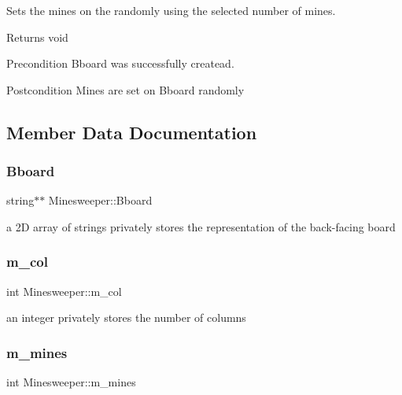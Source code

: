Sets the mines on the randomly using the selected number of mines. 

\begin{DoxyReturn}{Returns}
void 
\end{DoxyReturn}
\begin{DoxyPrecond}{Precondition}
Bboard was successfully createad. 
\end{DoxyPrecond}
\begin{DoxyPostcond}{Postcondition}
Mines are set on Bboard randomly 
\end{DoxyPostcond}


\subsection{Member Data Documentation}
\mbox{\label{classMinesweeper_aa990cf0cf6d3ffe348e93b0b176db90f}} 
\subsubsection{\texorpdfstring{Bboard}{Bboard}}
{\footnotesize\ttfamily string$\ast$$\ast$ Minesweeper\+::\+Bboard\hspace{0.3cm}{\ttfamily [private]}}

a 2D array of strings privately stores the representation of the back-\/facing board \mbox{\label{classMinesweeper_a1a42dbff44098fe674d172907ff0a224}} 
\subsubsection{\texorpdfstring{m\+\_\+col}{m\_col}}
{\footnotesize\ttfamily int Minesweeper\+::m\+\_\+col\hspace{0.3cm}{\ttfamily [private]}}

an integer privately stores the number of columns \mbox{\label{classMinesweeper_aa20d1458dce4ca9a3accd312df2e882e}} 
\subsubsection{\texorpdfstring{m\+\_\+mines}{m\_mines}}
{\footnotesize\ttfamily int Minesweeper\+::m\+\_\+mines\hspace{0.3cm}{\ttfamily [private]}}


